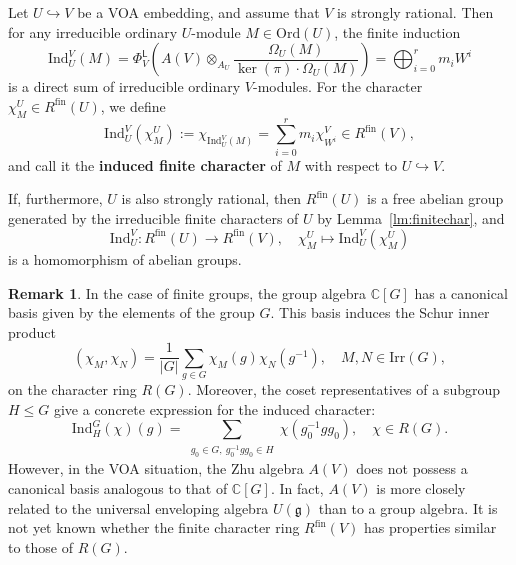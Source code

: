 \documentclass[12pt,a4paper,reqno]{amsart}
\numberwithin{equation}{section}
\numberwithin{equation}{section}
\theoremstyle{definition}
\newtheorem{remark}[thm]{Remark}
\def \C {\mathbb{C}}
\def\Ind{\mathrm{Ind}}
\def\L{\mathcal{L}}
\def\Ind{\mathrm{Ind}}
\def\L{\mathsf{L}}
\def\L{\mathsf{L}}
\def\fin{\mathrm{fin}}
\def\Ord{\mathrm{Ord}}
\begin{document}
	Let $U\hookrightarrow V$ be a VOA embedding, and assume that $V$ is strongly rational. 
	Then for any irreducible ordinary $U$-module $M\in \Ord(U)$, the finite induction
	\[
	\Ind^V_U(M)
	=\Phi_V^\L\!\left(A(V)\otimes_{A_U}\frac{\Omega_U(M)}{\ker(\pi)\cdot\Omega_U(M)}\right)
	=\bigoplus_{i=0}^r m_i W^i
	\]
	is a direct sum of irreducible ordinary $V$-modules. For the character $\chi^U_M\in R^\fin(U)$, we define 
	\begin{equation}
		\Ind^V_U (\chi^U_M):=\chi_{\Ind^V_U(M)}=\sum_{i=0}^r m_i \chi^V_{W^i}\in R^\fin(V),
	\end{equation}
	and call it the {\bf induced finite character} of $M$ with respect to $U\hookrightarrow V$. 
	
	If, furthermore, $U$ is also strongly rational, then $R^\fin(U)$ is a free abelian group generated by the irreducible finite characters of $U$ by Lemma~\ref{lm:finitechar}, and 
	\begin{equation}
		\Ind^V_U: R^\fin(U)\longrightarrow R^\fin(V),\quad 
		\chi^U_M\longmapsto \Ind^V_U (\chi^U_M)
	\end{equation}
	is a homomorphism of abelian groups. 
	
	\begin{remark}
		In the case of finite groups, the group algebra $\C[G]$ has a canonical basis given by the elements of the group $G$. This basis induces the Schur inner product  
		\[
		(\chi_M, \chi_N) = \frac{1}{|G|}\sum_{g \in G} \chi_M(g)\chi_N(g^{-1}),\quad M,N\in \mathrm{Irr}(G),
		\]
		on the character ring $R(G)$. Moreover, the coset representatives of a subgroup $H \leq G$ give a concrete expression for the induced character:
		\[
		\Ind_H^G(\chi)(g) = \sum_{\substack{g_0 \in G ,\  g_0^{-1} g g_0 \in H}} \chi(g_0^{-1} g g_0),\quad \chi\in R(G).
		\]
		However, in the VOA situation, the Zhu algebra $A(V)$ does not possess a canonical basis analogous to that of $\C[G]$. In fact, $A(V)$ is more closely related to the universal enveloping algebra $U(\mathfrak{g})$ than to a group algebra. It is not yet known whether the finite character ring $R^{\mathrm{fin}}(V)$ has properties similar to those of $R(G)$.
		
	\end{remark}
	
\end{document}
